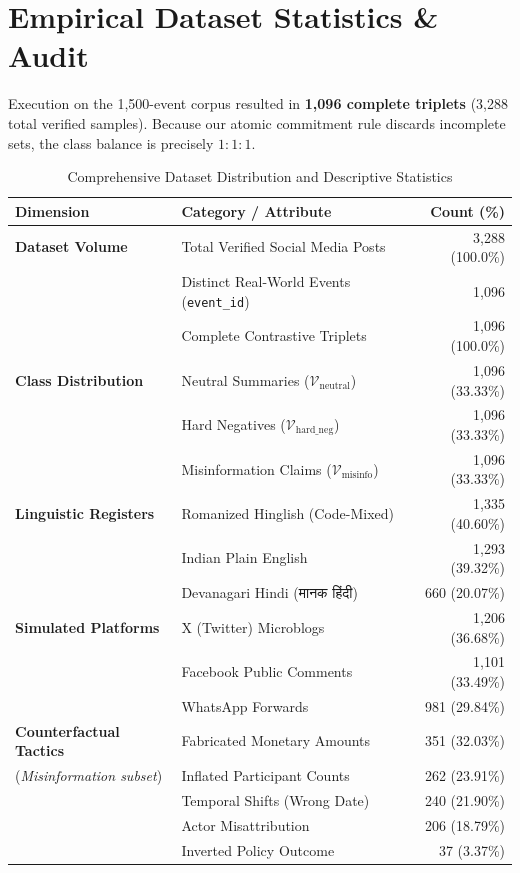 \documentclass[11pt,a4paper]{article}
\begin{document}
\section{Empirical Dataset Statistics \& Audit}
Execution on the 1,500-event corpus resulted in \textbf{1,096 complete triplets} (3,288 total verified samples). Because our atomic commitment rule discards incomplete sets, the class balance is precisely $1:1:1$.

\begin{table}[htbp]
\centering
\caption{Comprehensive Dataset Distribution and Descriptive Statistics}
\vspace{0.5em}
\small
\begin{tabular}{llr}
\toprule
\textbf{Dimension} & \textbf{Category / Attribute} & \textbf{Count (\%)} \\
\midrule
\textbf{Dataset Volume} & Total Verified Social Media Posts & 3,288 (100.0\%) \\
& Distinct Real-World Events (\texttt{event\_id}) & 1,096 \\
& Complete Contrastive Triplets & 1,096 (100.0\%) \\
\midrule
\textbf{Class Distribution} & Neutral Summaries ($\mathcal{V}_{\text{neutral}}$) & 1,096 (33.33\%) \\
& Hard Negatives ($\mathcal{V}_{\text{hard\_neg}}$) & 1,096 (33.33\%) \\
& Misinformation Claims ($\mathcal{V}_{\text{misinfo}}$) & 1,096 (33.33\%) \\
\midrule
\textbf{Linguistic Registers} & Romanized Hinglish (Code-Mixed) & 1,335 (40.60\%) \\
& Indian Plain English & 1,293 (39.32\%) \\
& Devanagari Hindi (मानक हिंदी) & 660 (20.07\%) \\
\midrule
\textbf{Simulated Platforms} & X (Twitter) Microblogs & 1,206 (36.68\%) \\
& Facebook Public Comments & 1,101 (33.49\%) \\
& WhatsApp Forwards & 981 (29.84\%) \\
\midrule
\textbf{Counterfactual Tactics} & Fabricated Monetary Amounts & 351 (32.03\%) \\
(\textit{Misinformation subset}) & Inflated Participant Counts & 262 (23.91\%) \\
& Temporal Shifts (Wrong Date) & 240 (21.90\%) \\
& Actor Misattribution & 206 (18.79\%) \\
& Inverted Policy Outcome & 37 (3.37\%) \\
\bottomrule
\end{tabular}
\end{table}
\end{document}
